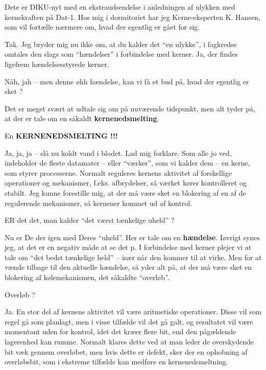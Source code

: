 \documentclass[a4paper,11pt]{article}
\begin{document}
\begin{sketch}

 Dete er DIKU-nyt med en ekstraudsendelse i anledningen af ulykken med
kernekraften på Dat-1.  Hos mig i dormitoriet har jeg Kerne-eksperten K. Hansen,
som vil fortælle nærmere om, hvad der egentlig er gået for sig.

 Tak. Jeg bryder mig nu ikke om, at du kalder det ``en ulykke'', i
fagkredse omtales den slags som ``hændelser'' i forbindelse med kerner. Ja, der
findes ligefrem hændelsesstyrede kerner.

 Nåh, jah -- men denne øhh hændelse, kan vi få et bud på, hvad der
egentlig er sket ?

 Det er meget svært at udtale sig om på nuværende tidspunkt, men alt
tyder på, at der er tale om en såkaldt \textbf{kernenedsmelting}.

 En \textbf{KERNENEDSMELTING !!!}

 Ja, ja, ja -- slå nu koldt vand i blodet. Lad mig forklare. Som alle jo
ved, indeholder de fleste datamater -- eller ``værker'', som vi kalder dem -- en
kerne, som styrer processerne.  Normalt reguleres kernens aktivitet af
forskellige operationer og mekanismer, f.eks. afbrydelser, så værket kører
kontrolleret og stabilt. Jeg kunne forestille mig, at der må være sket en
blokering af en af de regulerende mekanismer, så kernener kommet ud af kontrol.

 ER det det, man kalder ``det værst tænkelige uheld'' ?

 Nu er De der igen med Deres ``uheld''.  Her er tale om en
\textbf{hændelse}.  Iøvrigt synes jeg, at det er en negativ måde at se det p.  I
forbindelse med kerner plejer vi at tale om ``det bedst tænkelige held'' --
især når den kommer til at virke.  Men for at vænde tilbage til den aktuelle
hændelse, så yder alt på, at der må være sket en blokering af kølemekanismen,
det såkaldte ``overløb''.

 Overløb ?

 Ja.  En stor del af kernens aktivitet vil være aritmetiske
operationer.  Disse vil som regel gå som planlagt, men i visse tilfælde vil det
gå galt, og resultatet vil være momentant uden for kontrol, idet det kræer flere
bit, end den pågældende lagerenhed kan rumme.  Normalt klares dette ved at man
leder de overskydende bit væk gennem overløbet, men hvis dette er defekt, sker
der en ophobning af overløbsbit, som i ekstreme tilfælde kan medføre en
kernenedsmeltning.


\end{sketch}
\end{document}
